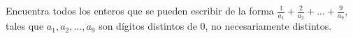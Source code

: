 Encuentra todos los enteros que se pueden escribir de la forma $\frac{1}{a_1}+\frac{2}{a_2}+...+\frac{9}{a_9}$, tales que $a_1,a_2, ...,a_9$ son dígitos distintos de 0, no necesariamente distintos.